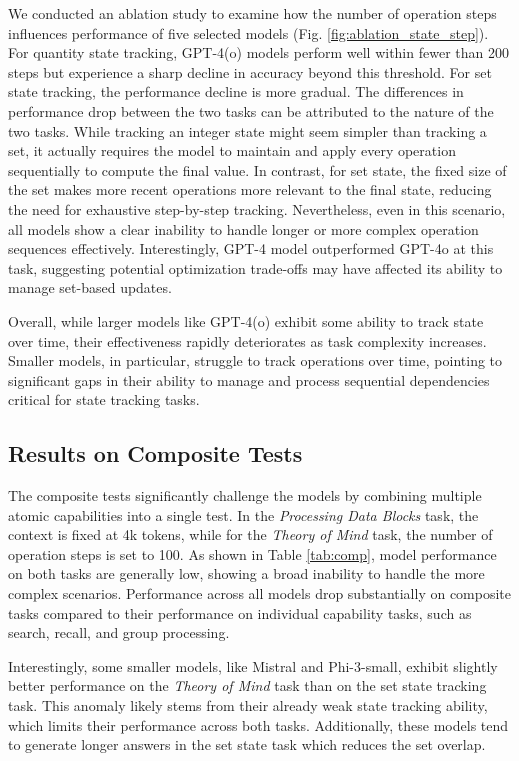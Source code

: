 We conducted an ablation study to examine how the number of operation steps influences performance of five selected models (Fig. \ref{fig:ablation_state_step}). For quantity state tracking, GPT-4(o) models perform well within fewer than 200 steps but experience a sharp decline in accuracy beyond this threshold. For set state tracking, the performance decline is more gradual. The differences in performance drop between the two tasks can be attributed to the nature of the two tasks. While tracking an integer state might seem simpler than tracking a set, it actually requires the model to maintain and apply every operation sequentially to compute the final value. In contrast, for set state, the fixed size of the set makes more recent operations more relevant to the final state, reducing the need for exhaustive step-by-step tracking. Nevertheless, even in this scenario, all models show a clear inability to handle longer or more complex operation sequences effectively. Interestingly, GPT-4 model outperformed GPT-4o at this task, suggesting potential optimization trade-offs may have affected its ability to manage set-based updates. 

Overall, while larger models like GPT-4(o) exhibit some ability to track state over time, their effectiveness rapidly deteriorates as task complexity increases. Smaller models, in particular, struggle to track operations over time, pointing to significant gaps in their ability to manage and process sequential dependencies critical for state tracking tasks.

\subsection{Results on Composite Tests}



The composite tests significantly challenge the models by combining multiple atomic capabilities into a single test. In the \textit{Processing Data Blocks} task, the context is fixed at 4k tokens, while for the \textit{Theory of Mind} task, the number of operation steps is set to 100. As shown in Table \ref{tab:comp}, model performance on both tasks are generally low, showing a broad inability to handle the more complex scenarios. Performance across all models drop substantially on composite tasks compared to their performance on individual capability tasks, such as search, recall, and group processing. 

Interestingly, some smaller models, like Mistral and Phi-3-small, exhibit slightly better performance on the \textit{Theory of Mind} task than on the set state tracking task. This anomaly likely stems from their already weak state tracking ability, which limits their performance across both tasks. Additionally, these models tend to generate longer answers in the set state task which reduces the set overlap.

